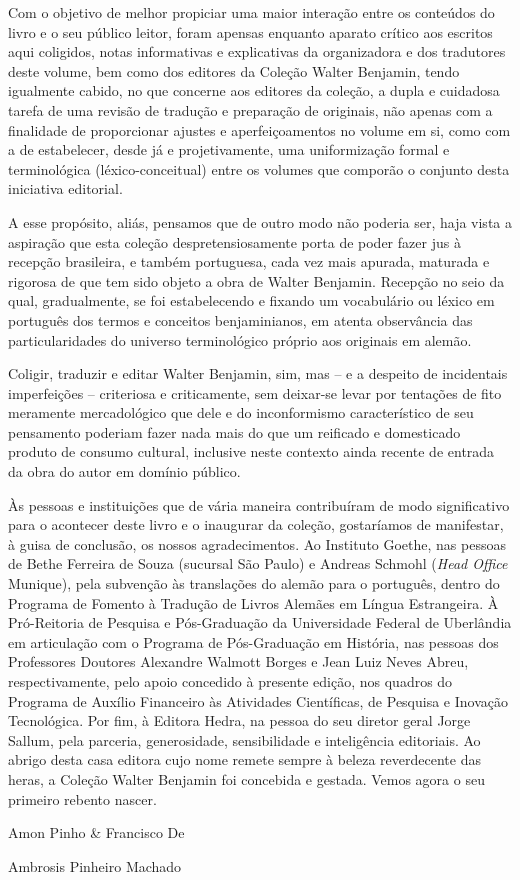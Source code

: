 Com o objetivo de melhor propiciar uma maior interação entre os
conteúdos do livro e o seu público leitor, foram apensas enquanto
aparato crítico aos escritos aqui coligidos, notas informativas e
explicativas da organizadora e dos tradutores deste volume, bem como dos
editores da Coleção Walter Benjamin, tendo igualmente cabido, no que
concerne aos editores da coleção, a dupla e cuidadosa tarefa de uma
revisão de tradução e preparação de originais, não apenas com a
finalidade de proporcionar ajustes e aperfeiçoamentos no volume em si,
como com a de estabelecer, desde já e projetivamente, uma uniformização
formal e terminológica (léxico-conceitual) entre os volumes que comporão
o conjunto desta iniciativa editorial.

A esse propósito, aliás, pensamos que de outro modo não poderia ser,
haja vista a aspiração que esta coleção despretensiosamente porta de
poder fazer jus à recepção brasileira, e também portuguesa, cada vez
mais apurada, maturada e rigorosa de que tem sido objeto a obra de
Walter Benjamin. Recepção no seio da qual, gradualmente, se foi
estabelecendo e fixando um vocabulário ou léxico em português dos termos
e conceitos benjaminianos, em atenta observância das particularidades do
universo terminológico próprio aos originais em alemão.

Coligir, traduzir e editar Walter Benjamin, sim, mas -- e a despeito de
incidentais imperfeições -- criteriosa e criticamente, sem deixar-se
levar por tentações de fito meramente mercadológico que dele e do
inconformismo característico de seu pensamento poderiam fazer nada mais
do que um reificado e domesticado produto de consumo cultural, inclusive
neste contexto ainda recente de entrada da obra do autor em domínio
público.

Às pessoas e instituições que de vária maneira contribuíram de modo
significativo para o acontecer deste livro e o inaugurar da coleção,
gostaríamos de manifestar, à guisa de conclusão, os nossos
agradecimentos. Ao Instituto Goethe, nas pessoas de Bethe Ferreira de
Souza (sucursal São Paulo) e Andreas Schmohl (\emph{Head Office}
Munique), pela subvenção às translações do alemão para o português,
dentro do Programa de Fomento à Tradução de Livros Alemães em Língua
Estrangeira. À Pró-Reitoria de Pesquisa e Pós-Graduação da Universidade
Federal de Uberlândia em articulação com o Programa de Pós-Graduação em
História, nas pessoas dos Professores Doutores Alexandre Walmott Borges
e Jean Luiz Neves Abreu, respectivamente, pelo apoio concedido à
presente edição, nos quadros do Programa de Auxílio Financeiro às
Atividades Científicas, de Pesquisa e Inovação Tecnológica. Por fim, à
Editora Hedra, na pessoa do seu diretor geral Jorge Sallum, pela
parceria, generosidade, sensibilidade e inteligência editoriais. Ao
abrigo desta casa editora cujo nome remete sempre à beleza reverdecente
das heras, a Coleção Walter Benjamin foi concebida e gestada. Vemos
agora o seu primeiro rebento nascer.

{\smallskip\small\itshape\hfill {Amon Pinho \& Francisco De\par
\hfill        Ambrosis Pinheiro Machado}}\medskip



